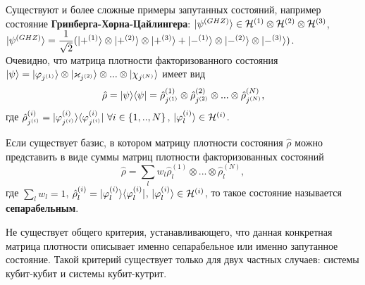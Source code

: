 Существуют и более сложные примеры запутанных состояний, например состояние \textbf{Гринберга-Хорна-Цайлингера}: $| \psi^{(GHZ)} \rangle \in \mathcal{H}^{(1)}\otimes\mathcal{H}^{(2)}\otimes\mathcal{H}^{(3)}$, $| \psi^{(GHZ)} \rangle = \dfrac{1}{\sqrt{2}}(| +^{(1)} \rangle\otimes| +^{(2)} \rangle\otimes| +^{(3)} \rangle + | -^{(1)} \rangle\otimes| -^{(2)} \rangle\otimes| -^{(3)} \rangle)$.\\

Очевидно, что матрица плотности факторизованного состояния $| \psi \rangle =| \varphi_{j^{(1)}} \rangle\otimes| \varkappa_{j^{(2)}} \rangle\otimes...\otimes| \chi_{j^{(N)}} \rangle$ имеет вид
\[
\hat{\rho} = | \psi \rangle\langle \psi | = \hat{\rho}_{j^{(1)}}^{(1)} \otimes\hat{\rho}_{j^{(2)}}^{(2)} \otimes ... \otimes\hat{\rho}_{j^{(N)}}^{(N)},
\]
где $\hat{\rho}_{j^{(i)}}^{(i)} = | \varphi_{j^{(i)}}^{(i)} \rangle\langle \varphi_{j^{(i)}}^{(i)} | \ \forall i\in\{1, .., N\}$, $| \varphi_l^{(i)} \rangle\in\mathcal{H}^{(i)}$.\\

\begin{definition}
	Если существует базис, в котором матрицу плотности состояния $\hat{\rho}$ можно представить в виде суммы матриц плотности факторизованных состояний
	\[
	\hat{\rho} = \sum\limits_l w_l \hat{\rho}_l^{(1)} \otimes ... \otimes\hat{\rho}_l^{(N)},
	\]
	где $\sum\limits_l w_l = 1$, $\hat{\rho}_l^{(i)} = | \varphi_l^{(i)} \rangle\langle \varphi_l^{(i)} |$, $| \varphi_l^{(i)} \rangle\in\mathcal{H}^{(i)}$, то такое состояние называется \textbf{сепарабельным}.
\end{definition}

Не существует общего критерия, устанавливающего, что данная конкретная матрица плотности описывает именно сепарабельное или именно запутанное состояние.  Такой критерий существует только для двух частных случаев: системы кубит-кубит и системы кубит-кутрит.\\

